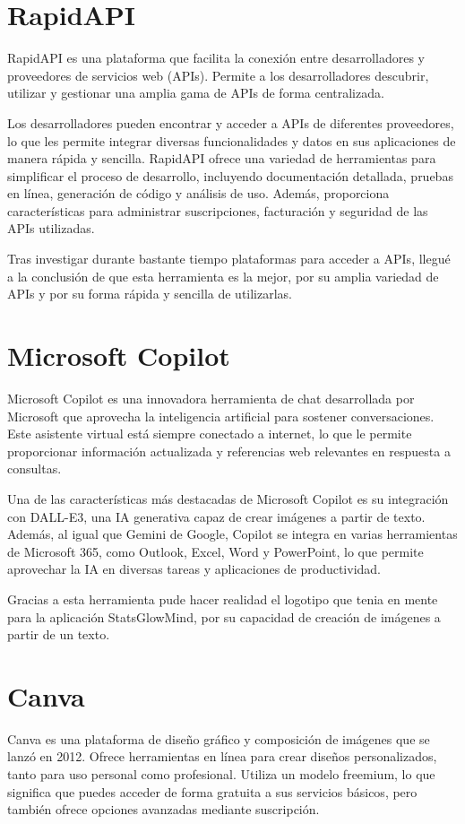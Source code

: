 \clearpage

\section{RapidAPI}
RapidAPI \cite{rapidapi} es una plataforma que facilita la conexión entre desarrolladores y proveedores de servicios web (APIs). Permite a los desarrolladores descubrir, utilizar y gestionar una amplia gama de APIs de forma centralizada.

Los desarrolladores pueden encontrar y acceder a APIs de diferentes proveedores, lo que les permite integrar diversas funcionalidades y datos en sus aplicaciones de manera rápida y sencilla. RapidAPI ofrece una variedad de herramientas para simplificar el proceso de desarrollo, incluyendo documentación detallada, pruebas en línea, generación de código y análisis de uso. Además, proporciona características para administrar suscripciones, facturación y seguridad de las APIs utilizadas.

Tras investigar durante bastante tiempo plataformas para acceder a APIs, llegué a la conclusión de que esta herramienta es la mejor, por su amplia variedad de APIs y por su forma rápida y sencilla de utilizarlas.

\hfill

\section{Microsoft Copilot}
Microsoft Copilot \cite{copilot} es una innovadora herramienta de chat desarrollada por Microsoft que aprovecha la inteligencia artificial para sostener conversaciones. Este asistente virtual está siempre conectado a internet, lo que le permite proporcionar información actualizada y referencias web relevantes en respuesta a consultas.

Una de las características más destacadas de Microsoft Copilot es su integración con DALL-E3, una IA generativa capaz de crear imágenes a partir de texto. Además, al igual que Gemini de Google, Copilot se integra en varias herramientas de Microsoft 365, como Outlook, Excel, Word y PowerPoint, lo que permite aprovechar la IA en diversas tareas y aplicaciones de productividad.

Gracias a esta herramienta pude hacer realidad el logotipo que tenia en mente para la aplicación StatsGlowMind, por su capacidad de creación de imágenes a partir de un texto.


\section{Canva}
Canva \cite{canva} es una plataforma de diseño gráfico y composición de imágenes que se lanzó en 2012. Ofrece herramientas en línea para crear diseños personalizados, tanto para uso personal como profesional. Utiliza un modelo freemium, lo que significa que puedes acceder de forma gratuita a sus servicios básicos, pero también ofrece opciones avanzadas mediante suscripción.

